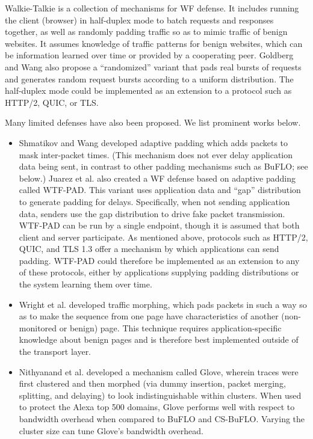 \documentclass[runningheads]{llncs}
\begin{document}
Walkie-Talkie \cite{wang2015walkie} is a collection of mechanisms for WF defense. It includes running
the client (browser) in half-duplex mode to batch requests and responses together, as well as randomly
padding traffic so as to mimic traffic of benign websites. It assumes knowledge of traffic patterns for
benign websites, which can be information learned over time or provided by a cooperating peer. Goldberg
and Wang also propose a ``randomized'' variant that pads real bursts of requests and generates random
request bursts according to a uniform distribution. The half-duplex mode could be implemented as an extension
to a protocol such as HTTP/2, QUIC, or TLS.

Many limited defenses have also been proposed. We list prominent works below.
%
\begin{itemize}
\item Shmatikov and Wang \cite{shmatikov2006timing} developed adaptive padding which adds packets to mask
inter-packet times. (This mechanism does not ever delay application data being sent, in contrast to other
padding mechanisms such as BuFLO; see below.)
Juarez et al. \cite{juarez2015wtf,juarez2016toward} also created a WF defense based on adaptive padding called WTF-PAD.
This variant uses application data and ``gap'' distribution to generate padding for delays. Specifically, when
not sending application data, senders use the gap distribution to drive fake packet transmission.
WTF-PAD can be run by a single endpoint, though it is assumed that both client and server participate.
As mentioned above, protocols such as HTTP/2, QUIC, and TLS 1.3 offer a mechanism by which applications can
send padding. WTF-PAD could therefore be implemented as an extension to any of these protocols, either by
applications supplying padding distributions or the system learning them over time.

\item Wright et al. \cite{wright2009traffic} developed traffic morphing, which pads packets in such a way
so as to make the sequence from one page have characteristics of another (non-monitored or benign) page.
This technique requires application-specific knowledge about benign pages and is therefore best implemented
outside of the transport layer.

\item Nithyanand et al. \cite{nithyanand2014glove} developed a mechanism called Glove,
wherein traces were first clustered and then morphed (via dummy insertion, packet
merging, splitting, and delaying) to look indistinguishable within clusters. When used
to protect the Alexa top 500 domains, Glove performs well with respect to bandwidth
overhead when compared to BuFLO and CS-BuFLO. Varying the cluster size can tune
Glove's bandwidth overhead.


\end{itemize}
\end{document}
